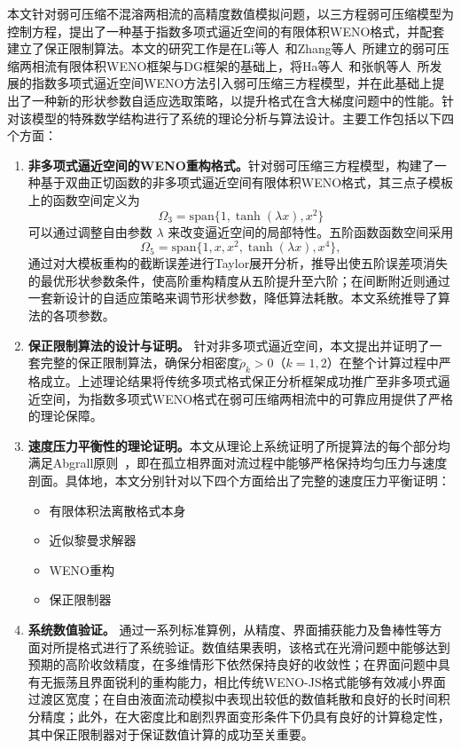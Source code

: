 \documentclass[12pt,a4paper]{article}
\numberwithin{equation}{section}    %
\begin{document}
本文针对弱可压缩不混溶两相流的高精度数值模拟问题，以三方程弱可压缩模型为控制方程，提出了一种基于指数多项式逼近空间的有限体积WENO格式，并配套建立了保正限制算法。本文的研究工作是在Li等人~\cite{li2020finite,li2022simplified}和Zhang等人~\cite{zhang2023physical,zhang2025positivity}所建立的弱可压缩两相流有限体积WENO框架与DG框架的基础上，将Ha等人~\cite{Ha2021}和张帆等人~\cite{Zhang2025exponential}所发展的指数多项式逼近空间WENO方法引入弱可压缩三方程模型，并在此基础上提出了一种新的形状参数自适应选取策略，以提升格式在含大梯度问题中的性能。针对该模型的特殊数学结构进行了系统的理论分析与算法设计。主要工作包括以下四个方面：
\begin{enumerate}
    \item \textbf{非多项式逼近空间的WENO重构格式。}针对弱可压缩三方程模型，构建了一种基于双曲正切函数的非多项式逼近空间有限体积WENO格式，其三点子模板上的函数空间定义为
    \begin{equation}
        \Omega_3 = \mathrm{span}\{1, \tanh(\lambda x), x^2\}
    \end{equation}
    可以通过调整自由参数 $\lambda$ 来改变逼近空间的局部特性。五阶函数函数空间采用
    \begin{equation}
        \Omega_5 = \mathrm{span}\{1, x, x^2, \tanh(\lambda x), x^4\},
    \end{equation}
    通过对大模板重构的截断误差进行Taylor展开分析，推导出使五阶误差项消失的最优形状参数条件，使高阶重构精度从五阶提升至六阶；在间断附近则通过一套新设计的自适应策略来调节形状参数，降低算法耗散。本文系统推导了算法的各项参数。
    \item \textbf{保正限制算法的设计与证明。} 针对非多项式逼近空间，本文提出并证明了一套完整的保正限制算法，确保分相密度$\tilde{\rho}_k > 0$（$k = 1, 2$）在整个计算过程中严格成立。上述理论结果将传统多项式格式保正分析框架成功推广至非多项式逼近空间，为指数多项式WENO格式在弱可压缩两相流中的可靠应用提供了严格的理论保障。
    \item \textbf{速度压力平衡性的理论证明。}本文从理论上系统证明了所提算法的每个部分均满足Abgrall原则~\cite{ABGRALL1996150}，即在孤立相界面对流过程中能够严格保持均匀压力与速度剖面。具体地，本文分别针对以下四个方面给出了完整的速度压力平衡证明：
    \begin{itemize}
        \item 有限体积法离散格式本身
        \item 近似黎曼求解器
        \item WENO重构
        \item 保正限制器
    \end{itemize}
    
    \item \textbf{系统数值验证。} 通过一系列标准算例，从精度、界面捕获能力及鲁棒性等方面对所提格式进行了系统验证。数值结果表明，该格式在光滑问题中能够达到预期的高阶收敛精度，在多维情形下依然保持良好的收敛性；在界面问题中具有无振荡且界面锐利的重构能力，相比传统WENO-JS格式能够有效减小界面过渡区宽度；在自由液面流动模拟中表现出较低的数值耗散和良好的长时间积分精度；此外，在大密度比和剧烈界面变形条件下仍具有良好的计算稳定性，其中保正限制器对于保证数值计算的成功至关重要。  
\end{enumerate}
\end{document}
